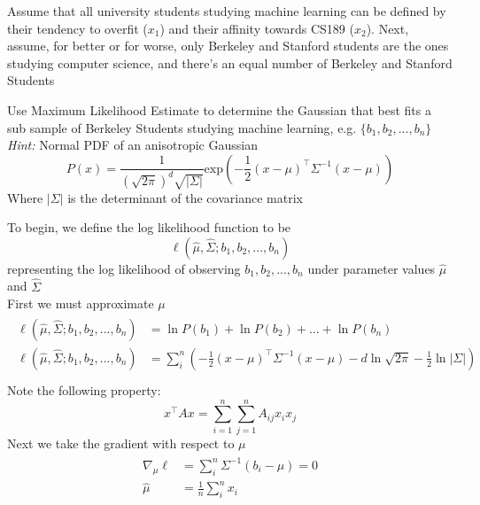 Assume that all university students studying machine learning can be defined by their tendency to overfit ($x_1$) and their affinity towards CS189 ($x_2$). Next, assume, for better or for worse, only Berkeley and Stanford students are the ones studying computer science, and there's an equal number of Berkeley and Stanford Students
\begin{Parts}
\Part Use Maximum Likelihood Estimate to determine the Gaussian that best fits a sub sample of Berkeley Students studying machine learning, e.g. $\{b_1, b_2,..., b_n\}$\\
\textit{Hint: } Normal PDF of an anisotropic Gaussian
\[
P(x) = \frac{1}{(\sqrt{2\pi})^d\sqrt{|\Sigma|}} \text{exp}(-\frac{1}{2}(x - \mu)^{\top}\Sigma^{-1}(x- \mu))
\]
Where $|\Sigma|$ is the determinant of the covariance matrix

\begin{solution}
    To begin, we define the log likelihood function to be \[\ell(\hat{\mu},\hat{\Sigma};b_1, b_2,..., b_n)\] representing the log likelihood of observing $b_1, b_2,...,b_n$ under parameter values $\hat{\mu}$ and $\hat{\Sigma}$\\
    First we must approximate $\mu$
    \begin{align}
        \begin{aligned}
            \ell(\hat{\mu},\hat{\Sigma};b_1, b_2,..., b_n) &= \ln P(b_1) + \ln P(b_2) + ... + \ln P(b_n)\\
            \ell(\hat{\mu},\hat{\Sigma};b_1, b_2,..., b_n) &= \sum_i^n (-\frac{1}{2}(x - \mu)^{\top}\Sigma^{-1}(x- \mu) - d\ln \sqrt{2 \pi} - \frac{1}{2}\ln |\Sigma|)\\
        \end{aligned}
    \end{align}
    Note the following property: \[x^{\top}Ax = \sum^n_{i=1}\sum^n_{j=1}A_{ij} x_i x_j\]
    Next we take the gradient with respect to $\mu$
    \begin{align}
        \begin{aligned}
            \nabla_{\mu} \ell &= \sum^n_i \Sigma^{-1} (b_i - \mu) = 0\\
            \hat{\mu} &= \frac{1}{n}\sum^n_i x_i
        \end{aligned}
    \end{align}


\end{solution}
\end{Parts}
